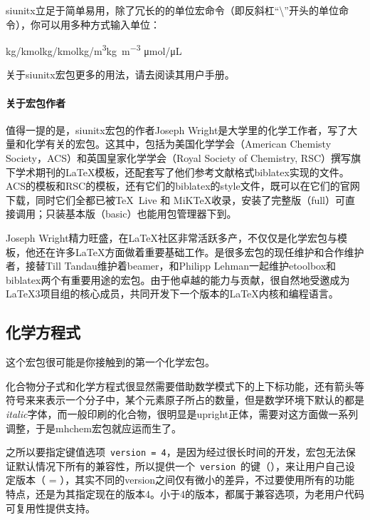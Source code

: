 \documentclass[a4paper,UTF8,zihao = -4]{ctexart} %
\begin{document}
\textsf{siunitx}立足于简单易用，除了冗长的的单位宏命令（即反斜杠“\textbackslash{}”开头的单位命令），你可以用多种方式输入单位：

\begin{dispExample}
\si{kg/kmol}\quad \si{\kg/\kmol}\quad \si{kg/m^3}\quad \si{kg.m^{-3}}\quad
\si{\umol/\uL}
\end{dispExample}

关于\textsf{siunitx}宏包更多的用法，请去阅读其用户手册。

\paragraph{关于宏包作者}

值得一提的是，\textsf{siunitx}宏包的作者Joseph Wright是大学里的化学工作者，写了大量和化学有关的宏包。这其中，包括为美国化学学会（American Chemisty Society，ACS）和英国皇家化学学会（Royal Society of Chemistry, RSC）撰写旗下学术期刊的\LaTeX{}模板，还配套写了他们参考文献格式\textsf{biblatex}实现的文件。ACS的模板和RSC的模板，还有它们的\textsf{biblatex}的style文件，既可以在它们的官网下载，同时它们全都已被\TeX\ Live 和 MiK\TeX{}收录，安装了完整版（full）可直接调用；只装基本版（basic）也能用包管理器下到。

Joseph Wright精力旺盛，在\LaTeX{}社区非常活跃多产，不仅仅是化学宏包与模板，他还在许多\LaTeX{}方面做着重要基础工作。是很多宏包的现任维护和合作维护者，接替Till Tandau维护着\textsf{beamer}，和Philipp Lehman一起维护\textsf{etoolbox}和\textsf{biblatex}两个有重要用途的宏包。由于他卓越的能力与贡献，很自然地受邀成为\LaTeX{}3项目组的核心成员，共同开发下一个版本的\LaTeX{}内核和编程语言。
\subsection{化学方程式}
\label{sec:mhchem}

这个宏包很可能是你接触到的第一个化学宏包。

化合物分子式和化学方程式很显然需要借助数学模式下的上下标功能，还有箭头等符号来来表示一个分子中，某个元素原子所占的数量，但是数学环境下默认的都是\textit{italic}字体，而一般印刷的化合物，很明显是upright正体，需要对这方面做一系列调整，于是\textsf{mhchem}宏包就应运而生了。

\begin{dispListing}
\usepackage[version = 4]{mhchem} %
\end{dispListing}

之所以要指定键值选项~\verb|version = 4|，是因为经过很长时间的开发，宏包无法保证默认情况下所有的兼容性，所以提供一个~\verb|version|~的键（），来让用户自己设定版本（ = ），其实不同的version之间仅有微小的差异，不过要使用所有的功能特点，还是为其指定现在的版本4。小于4的版本，都属于兼容选项，为老用户代码可复用性提供支持。
\end{document}
